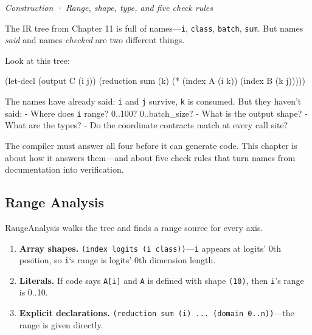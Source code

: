 \documentclass[11pt,titlepage]{article}
\newenvironment{Shaded}{}{}
\newcommand{\NormalTok}[1]{#1}
\newcommand{\OperatorTok}[1]{\textcolor[rgb]{0.40,0.40,0.40}{#1}}
\providecommand{\tightlist}{%
  \setlength{\itemsep}{0pt}\setlength{\parskip}{0pt}}
\begin{document}
\emph{Construction · Range, shape, type, and five check rules}

\vspace{2em}

The IR tree from Chapter 11 is full of names---\texttt{i},
\texttt{class}, \texttt{batch}, \texttt{sum}. But names \emph{said} and
names \emph{checked} are two different things.

Look at this tree:

\begin{Shaded}
\begin{Highlighting}[]
\NormalTok{(let-decl (output C (i j))}
\NormalTok{  (reduction sum (k)}
\NormalTok{    (}\OperatorTok{*}\NormalTok{ (index A (i k)) (index B (k j)))))}
\end{Highlighting}
\end{Shaded}

The names have already said: \texttt{i} and \texttt{j} survive,
\texttt{k} is consumed. But they haven't said: - Where does \texttt{i}
range? 0..100? 0..batch\_size? - What is the output shape? - What are
the types? - Do the coordinate contracts match at every call site?

The compiler must answer all four before it can generate code. This
chapter is about how it answers them---and about five check rules that
turn names from documentation into verification.

\vspace{2em}

\hypertarget{range-analysis}{%
\subsection{Range Analysis}\label{range-analysis}}

RangeAnalysis walks the tree and finds a range source for every axis.

\begin{enumerate}
\def\labelenumi{\arabic{enumi}.}
\tightlist
\item
  \textbf{Array shapes.}
  \texttt{(index\ logits\ (i\ class))}---\texttt{i} appears at logits'
  0th position, so \texttt{i}`s range is logits' 0th dimension length.
\item
  \textbf{Literals.} If code says \texttt{A{[}i{]}} and \texttt{A} is
  defined with shape \texttt{(10)}, then \texttt{i}'s range is 0..10.
\item
  \textbf{Explicit declarations.}
  \texttt{(reduction\ sum\ (i)\ ...\ (domain\ 0..n))}---the range is
  given directly.
\end{enumerate}
\end{document}
